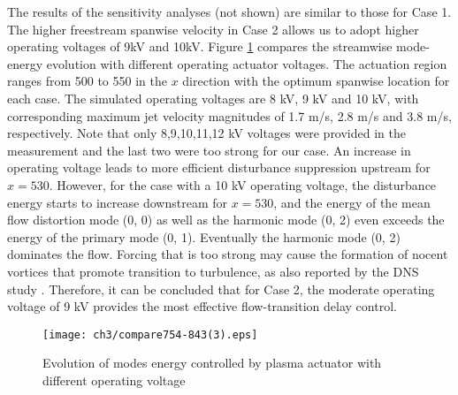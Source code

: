 The results of the sensitivity analyses (not shown) are similar to those for Case 1. The higher freestream spanwise velocity in Case 2 allows us to adopt higher operating voltages of 9kV and 10kV. Figure \ref{f:voltage} compares the streamwise mode-energy evolution with different operating actuator voltages. The actuation region ranges from 500 to 550 in the $x$ direction with the optimum spanwise location for each case. The simulated operating voltages are 8 kV, 9 kV and 10 kV, with corresponding maximum jet velocity magnitudes of 1.7 m/s, 2.8 m/s and 3.8 m/s, respectively. Note that only 8,9,10,11,12 kV voltages were provided in the measurement \cite{kriegseis2013velocity} and the last two were too strong for our case. An increase in operating voltage leads to more efficient disturbance suppression upstream for $x = 530$. However, for the case with a 10 kV operating voltage, the disturbance energy starts to increase downstream for $x = 530$, and the energy of the mean flow distortion mode (0, 0) as well as the harmonic mode (0, 2) even exceeds the energy of the primary mode (0, 1). Eventually the harmonic mode (0, 2) dominates the flow. Forcing that is too strong may cause the formation of nocent vortices that promote transition to turbulence, as also reported by the DNS study \cite{dorr2016}. Therefore, it can be concluded that for Case 2, the moderate operating voltage of 9 kV provides the most effective flow-transition delay control.

\begin{figure}
  \centering
  \texttt{[image: ch3/compare754-843(3).eps]}\\
  \caption{Evolution of modes energy controlled by plasma actuator with different operating voltage}\label{f:voltage}
\end{figure}
